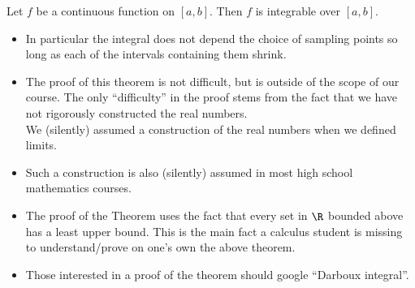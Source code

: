 \begin{frame}
\begin{theorem}
Let $f$ be a continuous function on $[a,b]$. Then $f$ is integrable over $[a,b]$.
\end{theorem}
\begin{itemize}
\item In particular the integral does not depend the choice of sampling points so long as each of the intervals containing them shrink.
\item The proof of this theorem is not difficult, but is outside of the scope of our course. The only ``difficulty'' in the proof stems from the fact that we have not rigorously constructed the real numbers.\\ 
We (silently) assumed a construction of the real numbers when we defined limits. 
\item Such a construction is also (silently) assumed in most high school mathematics courses.
\item  The proof of the Theorem uses the fact that every set in $ \R $ bounded above has a least upper bound. %
This is the main fact a calculus student is missing to understand/prove on one's own the above theorem.
\item Those interested in a proof of the theorem should google ``Darboux integral''.
\end{itemize}

\end{frame}

